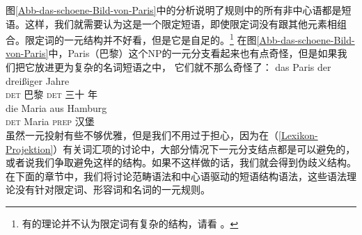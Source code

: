 图\ref{Abb-das-schoene-Bild-von-Paris}中的分析说明了规则中的所有非中心语都是短语。这样，我们就需要认为这是一个限定短语，即使限定词没有跟其他元素相组合。限定词的一元结构并不好看，但是它是自足的。\footnote{%
有的\xbarc 理论并不认为限定词有复杂的结构，请看 。
}
在图\ref{Abb-das-schoene-Bild-von-Paris}中，Paris（巴黎）这个NP的一元分支看起来也有点奇怪，但是如果我们把它放进更为复杂的名词短语之中， 它们就不那么奇怪了：
\eal
\ex 
\gll das Paris der dreißiger Jahre\\
	 \textsc{det} 巴黎 \textsc{det} 三十 年\\
\ex 
\gll die Maria aus Hamburg\\
	 \textsc{det} Maria \textsc{prep} 汉堡\\
\zl
虽然一元投射有些不够优雅，但是我们不用过于担心，因为在（\ref{Lexikon-Projektion}）有关词汇项的讨论中，大部分情况下一元分支结点都是可以避免的，或者说我们争取避免这样的结构。如果不这样做的话，我们就会得到伪歧义结构。在下面的章节中，我们将讨论范畴语法和中心语驱动的短语结构语法，这些语法理论没有针对限定词、形容词和名词的一元规则。

